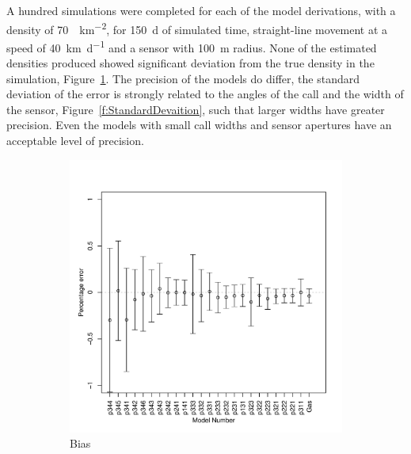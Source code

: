 \documentclass[a4paper,10pt,reqno,oneside]{amsart}
\begin{document}
A hundred simulations were completed for each of the model derivations, with a density of   \SI{70}{\animals\per\kilo\meter\squared}, for \SI{150}{\day} of simulated time, straight-line movement at a speed of \SI{40}{\kilo\meter\per\day} and a sensor with \SI{100}{\meter} radius. None of the estimated densities produced showed significant deviation from the true density in the simulation, Figure~\ref{f:ModelBias}. The precision of the models do differ, the standard deviation of the error is strongly related to the angles of the call and the width of the sensor, Figure~\ref{f:StandardDevaition}, such that larger widths have greater precision. Even the models with small call widths and sensor apertures have an acceptable level of precision. 

\begin{figure}
	\centering
	\begin{subfigure}[t]{0.5\textwidth}
	\includegraphics[width=1\textwidth]{imgs/AverageModelBias.pdf}
	\caption{Bias}
	\label{f:ModelBias}
	\end{subfigure}
	~
	\begin{subfigure}[t]{0.5\textwidth}

\end{subfigure}
\end{figure}
\end{document}
